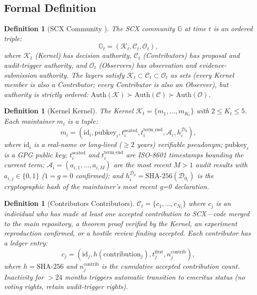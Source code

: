 \documentclass[12pt,a4paper]{article}
\newtheorem{definition}[theorem]{Definition}
\theoremstyle{definition}
\newcommand{\Kernel}{\mathcal{K}}
\newcommand{\Contributors}{\mathcal{C}}
\newcommand{\Observers}{\mathcal{O}}
\newcommand{\Community}{\mathbb{G}}
\newcommand{\gzero}{g=0}
\newcommand{\GzeroDecl}{\mathcal{D}_{0}}
\begin{document}
\subsection{Formal Definition}
\begin{definition}[SCX Community ]
\label{def:community}
The SCX community $\Community$ at time $t$ is an ordered triple:
\begin{equation}
    \Community_t = (\Kernel_t, \Contributors_t, \Observers_t),
    \label{eq:community}
\end{equation}
where $\Kernel_t$ (Kernel) has decision authority, $\Contributors_t$ (Contributors) has proposal and audit-trigger authority, and $\Observers_t$ (Observers) has observation and evidence-submission authority. The layers satisfy $\Kernel_t \subset \Contributors_t \subset \Observers_t$ as sets (every Kernel member is also a Contributor; every Contributor is also an Observer), but authority is strictly ordered: $\text{Auth}(\Kernel) \succ \text{Auth}(\Contributors) \succ \text{Auth}(\Observers)$.
\end{definition}
\begin{definition}[Kernel Kernel]
\label{def:kernel}
The Kernel $\Kernel_t = \{m_1, \ldots, m_{K_t}\}$ with $2 \leq K_t \leq 5$. Each maintainer $m_i$ is a tuple:
\begin{equation}
    m_i = (\text{id}_i, \text{pubkey}_i, t_i^{\text{seated}}, t_i^{\text{term\_end}}, \mathcal{A}_i, h_i^{\GzeroDecl}),
    \label{eq:maintainer}
\end{equation}
where $\text{id}_i$ is a real-name or long-lived ($\geq 2$ years) verifiable pseudonym; $\text{pubkey}_i$ is a GPG public key; $t_i^{\text{seated}}$ and $t_i^{\text{term\_end}}$ are ISO-8601 timestamps bounding the current term; $\mathcal{A}_i = (a_{i,1}, \ldots, a_{i,M})$ are the most recent $M > 1$ audit results with $a_{i,j} \in \{0, 1\}$ ($1 = \gzero$ confirmed); and $h_i^{\GzeroDecl} = \text{SHA-256}(\GzeroDecl_i)$ is the cryptographic hash of the maintainer's most recent g=0 declaration.
\end{definition}
\begin{definition}[Contributors Contributors]
\label{def:contributors}
$\Contributors_t = \{c_1, \ldots, c_{N_t}\}$ where $c_j$ is an individual who has made at least one accepted contribution to SCX---code merged to the main repository, a theorem proof verified by the Kernel, an experiment reproduction confirmed, or a hostile review finding accepted. Each contributor has a ledger entry:
\begin{equation}
    c_j = (\text{id}_j, h(\text{contribution}_j), t_j^{\text{first}}, n_j^{\text{contrib}}),
    \label{eq:contributor}
\end{equation}
where $h = \text{SHA-256}$ and $n_j^{\text{contrib}}$ is the cumulative accepted contribution count. Inactivity for $> 24$ months triggers automatic transition to emeritus status (no voting rights, retain audit-trigger rights).
\end{definition}
\end{document}
